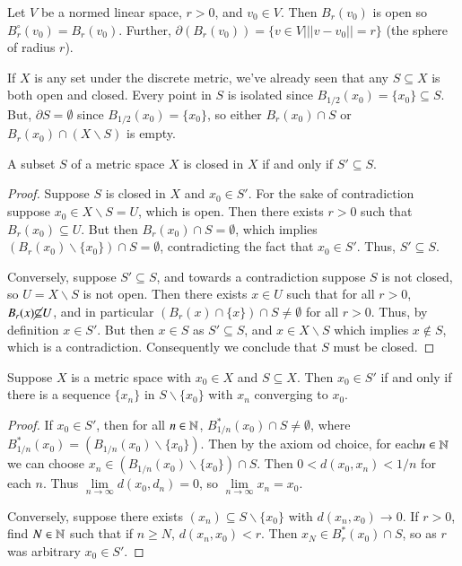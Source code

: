 \begin{example}
    Let $V$ be a normed linear space, $r > 0$, and $v_0 \in V$. Then $B_r(v_0)$ is open so $B_r^{\circ}(v_0) = B_r(v_0)$. Further, $\partial(B_r(v_0)) = \{v \in V\vert ||v-v_0|| = r\}$ (the sphere of radius $r$).
\end{example}

\begin{example}
    If $X$ is any set under the discrete metric, we've already seen that any $S \subseteq X$ is both open and closed. Every point in $S$ is isolated since $B_{1/2}(x_0) = \{x_0\} \subseteq S$. But, $\partial S = \emptyset$ since $B_{1/2}(x_0) = \{x_0\}$, so either $B_r(x_0)\cap S$ or $B_r(x_0) \cap (X\backslash S)$ is empty.
\end{example}

\begin{proposition}
    A subset $S$ of a metric space $X$ is closed in $X$ if and only if $S' \subseteq S$.
\end{proposition}
\begin{proof}
    Suppose $S$ is closed in $X$ and $x_0 \in S'$. For the sake of contradiction suppose $x_0 \in X\backslash S = U$, which is open. Then there exists $r > 0$ such that $B_r(x_0) \subseteq U$. But then $B_r(x_0) \cap S = \emptyset$, which implies $(B_r(x_0)\backslash\{x_0\})\cap S = \emptyset$, contradicting the fact that $x_0 \in S'$. Thus, $S' \subseteq S$.

    Conversely, suppose $S' \subseteq S$, and towards a contradiction suppose $S$ is not closed, so $U = X\backslash S$ is not open. Then there exists $x \in U$ such that for all $r > 0$, $B_r(x) \cancel{\subseteq} U$, and in particular $(B_r(x)\cap \{x\})\cap S \neq \emptyset$ for all $r > 0$. Thus, by definition $x \in S'$. But then $x \in S$ as $S' \subseteq S$, and $x \in X\backslash S$ which implies $x \notin S$, which is a contradiction. Consequently we conclude that $S$ must be closed.
\end{proof}

\begin{proposition}
    Suppose $X$ is a metric space with $x_0 \in X$ and $S \subseteq X$. Then $x_0 \in S'$ if and only if there is a sequence $\{x_n\}$ in $S\backslash\{x_0\}$ with $x_n$ converging to $x_0$.
\end{proposition}
\begin{proof}
    If $x_0 \in S'$, then for all $n \in \mathbb N$, $B^*_{1/n}(x_0) \cap S\neq \emptyset$, where $B^*_{1/n}(x_0) = (B_{1/n}(x_0)\backslash \{x_0\})$. Then by the axiom od choice, for each$ n \in \mathbb N$ we can choose $x_n \in (B_{1/n}(x_0)\backslash\{x_0\})\cap S$. Then $0 < d(x_0,x_n) < 1/n$ for each $n$. Thus $\lim\limits_{n\rightarrow \infty}d(x_0,d_n) = 0$, so $\lim\limits_{n\rightarrow \infty}x_n = x_0$.

    Conversely, suppose there exists $(x_n) \subseteq S\backslash\{x_0\}$ with $d(x_n,x_0)\rightarrow 0$. If $r > 0$, find $N \in \mathbb N$ such that if $n \geq N$, $d(x_n,x_0) < r$. Then $x_N \in B_r^*(x_0)\cap S$, so as $r$ was arbitrary $x_0 \in S'$.
\end{proof}

